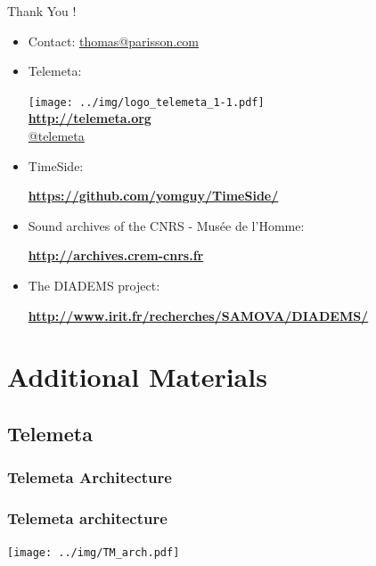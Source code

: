\documentclass[final, hyperref, table]{beamer}
\begin{document}
\begin{frame}{Thank You !}
  \begin{itemize}
  \item Contact: \url{thomas@parisson.com}
  \item Telemeta:
    \begin{center}
    \texttt{[image: ../img/logo\_telemeta\_1-1.pdf]}\\
      \colorbox{yellow!40}{\textbf{\url{http://telemeta.org}}}\\
      \colorbox{yellow!40}{\href{https://twitter.com/telemeta/}{@telemeta}}
    \end{center}

  \item TimeSide:
    \begin{center}
      \colorbox{yellow!40}{\bf
        \url{https://github.com/yomguy/TimeSide/}}
    \end{center}

  \item Sound archives of the CNRS - Musée de l’Homme:
    \begin{center}
      \colorbox{yellow!40}{\bf\url{http://archives.crem-cnrs.fr}}
    \end{center}

  \item The DIADEMS project:
    \begin{center}
      \colorbox{yellow!40}{\bf
        \url{http://www.irit.fr/recherches/SAMOVA/DIADEMS/}}
    \end{center}

  \end{itemize}
\end{frame}

\appendix
\section{Additional Materials}
\subsection{Telemeta}
\subsubsection{Telemeta Architecture}
\begin{frame}\frametitle{Telemeta architecture}
  \begin{center}
    \texttt{[image: ../img/TM\_arch.pdf]}
  \end{center}
\end{frame}
\end{document}

